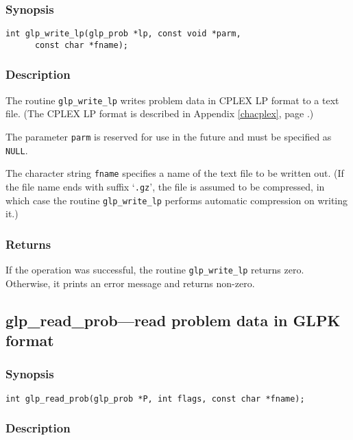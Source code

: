 \subsubsection*{Synopsis}

\begin{verbatim}
int glp_write_lp(glp_prob *lp, const void *parm,
      const char *fname);
\end{verbatim}

\subsubsection*{Description}

The routine \verb|glp_write_lp| writes problem data in CPLEX LP format
to a text file. (The CPLEX LP format is described in Appendix
\ref{chacplex}, page \pageref{chacplex}.)

The parameter \verb|parm| is reserved for use in the future and must be
specified as \verb|NULL|.

The character string \verb|fname| specifies a name of the text file to
be written out. (If the file name ends with suffix `\verb|.gz|', the
file is assumed to be compressed, in which case the routine
\verb|glp_write_lp| performs automatic compression on writing it.)

\subsubsection*{Returns}

If the operation was successful, the routine \verb|glp_write_lp|
returns zero. Otherwise, it prints an error message and returns
non-zero.

\subsection{glp\_read\_prob---read problem data in GLPK format}

\subsubsection*{Synopsis}

\begin{verbatim}
int glp_read_prob(glp_prob *P, int flags, const char *fname);
\end{verbatim}

\subsubsection*{Description}

